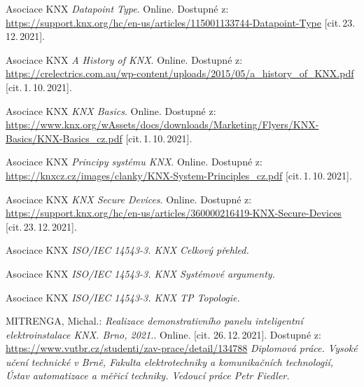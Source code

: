 
\begin{thebibliography}{99}

    	Asociace KNX \emph{Datapoint Type}.\/ Online. 
    	Dostupné z:
    \url{https://support.knx.org/hc/en-us/articles/115001133744-Datapoint-Type}
    [cit.\,23.\,12.\,2021]. 
    
		Asociace KNX 
		\emph{A History of KNX}.\/ Online.
		Dostupné z:
    \url{https://crelectrics.com.au/wp-content/uploads/2015/05/a_history_of_KNX.pdf}  
    [cit.\,1.\,10.\,2021]. 
    
		Asociace KNX
		\emph{KNX Basics}.\/ Online.
		Dostupné z:
    \url{https://www.knx.org/wAssets/docs/downloads/Marketing/Flyers/KNX-Basics/KNX-Basics_cz.pdf} 
		[cit.\,1.\,10.\,2021].
    
    	Asociace KNX \emph{Principy systému KNX}.\/ Online. 
    	Dostupné z:
    \url{https://knxcz.cz/images/clanky/KNX-System-Principles_cz.pdf} 
    	[cit.\,1.\,10.\,2021].
    
    	Asociace KNX \emph{KNX Secure Devices}.\/ Online. 
    	Dostupné z:
    \url{https://support.knx.org/hc/en-us/articles/360000216419-KNX-Secure-Devices} 
    	[cit.\,23.\,12.\,2021].
    
    Asociace KNX \emph{ISO/IEC 14543-3. KNX Celkový přehled.}
    
    Asociace KNX \emph{ISO/IEC 14543-3. KNX Systémové argumenty.}
    
    Asociace KNX \emph{ISO/IEC 14543-3. KNX TP Topologie.}
    
    MITRENGA, Michal.:
    \emph{Realizace demonstrativního panelu inteligentní elektroinstalace KNX. Brno, 2021.}.\/ Online. 
    [cit. 26.\,12.\,2021].
    Dostupné z:
    \url{https://www.vutbr.cz/studenti/zav-prace/detail/134788}
    \emph{Diplomová práce. Vysoké učení technické v Brně, Fakulta elektrotechniky a komunikačních technologií, Ústav automatizace a měřicí techniky. Vedoucí práce Petr Fiedler.}
 


\end{thebibliography}
